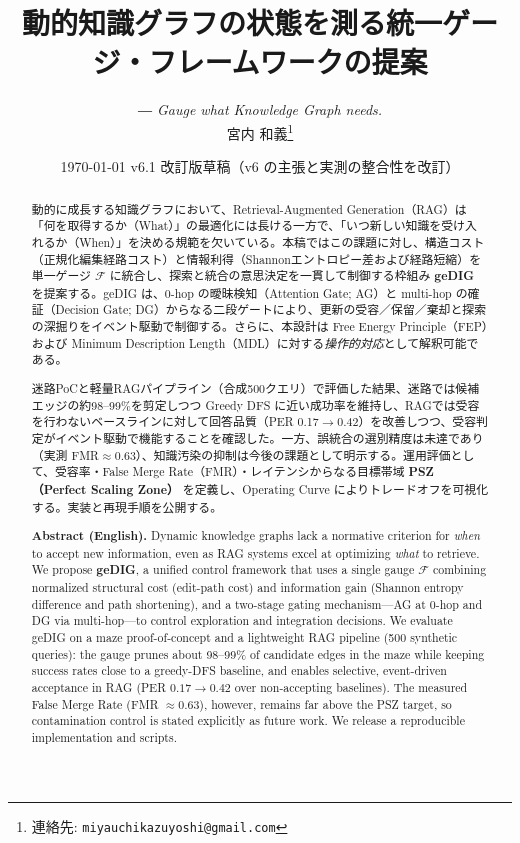\documentclass[ja=standard,xelatex]{bxjsarticle}
\title{動的知識グラフの状態を測る統一ゲージ・フレームワークの提案}
\author{\texorpdfstring{\textit{\small ― Gauge what Knowledge Graph needs.}\\[0.3em]}{}%
宮内 和義\thanks{連絡先: \texttt{miyauchikazuyoshi@gmail.com}}}
\date{\today\; v6.1 改訂版草稿（v6 の主張と実測の整合性を改訂）}
\newcommand{\F}{\mathcal{F}}
\begin{document}
\sloppy
\maketitle

\begin{abstract}
動的に成長する知識グラフにおいて、Retrieval-Augmented Generation（RAG）は「何を取得するか（What）」の最適化には長ける一方で、「いつ新しい知識を受け入れるか（When）」を決める規範を欠いている。本稿ではこの課題に対し、構造コスト（正規化編集経路コスト）と情報利得（Shannonエントロピー差および経路短縮）を単一ゲージ $\F$ に統合し、探索と統合の意思決定を一貫して制御する枠組み \textbf{geDIG} を提案する。geDIG は、0-hop の曖昧検知（Attention Gate; AG）と multi-hop の確証（Decision Gate; DG）からなる二段ゲートにより、更新の受容／保留／棄却と探索の深掘りをイベント駆動で制御する。さらに、本設計は Free Energy Principle（FEP）および Minimum Description Length（MDL）に対する\textit{操作的対応}として解釈可能である。

迷路PoCと軽量RAGパイプライン（合成500クエリ）で評価した結果、迷路では候補エッジの約98--99\%を剪定しつつ Greedy DFS に近い成功率を維持し、RAGでは受容を行わないベースラインに対して回答品質（PER 0.17$\to$0.42）を改善しつつ、受容判定がイベント駆動で機能することを確認した。一方、誤統合の選別精度は未達であり（実測 FMR$\approx$0.63）、知識汚染の抑制は今後の課題として明示する。運用評価として、受容率・False Merge Rate（FMR）・レイテンシからなる目標帯域 \textbf{PSZ（Perfect Scaling Zone）} を定義し、Operating Curve によりトレードオフを可視化する。実装と再現手順を公開する。

\par\medskip
\noindent\textbf{Abstract (English).}\;
Dynamic knowledge graphs lack a normative criterion for \emph{when} to accept new information, even as RAG systems excel at optimizing \emph{what} to retrieve. We propose \textbf{geDIG}, a unified control framework that uses a single gauge $\F$ combining normalized structural cost (edit-path cost) and information gain (Shannon entropy difference and path shortening), and a two-stage gating mechanism---AG at 0-hop and DG via multi-hop---to control exploration and integration decisions. We evaluate geDIG on a maze proof-of-concept and a lightweight RAG pipeline (500 synthetic queries): the gauge prunes about 98--99\% of candidate edges in the maze while keeping success rates close to a greedy-DFS baseline, and enables selective, event-driven acceptance in RAG (PER $0.17\to0.42$ over non-accepting baselines). The measured False Merge Rate (FMR $\approx 0.63$), however, remains far above the PSZ target, so contamination control is stated explicitly as future work. We release a reproducible implementation and scripts.
\end{abstract}
\end{document}
